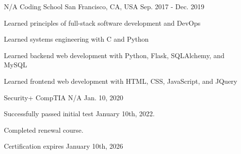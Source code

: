 

\begin{cventries}

	\cventry
	{N/A} %
	{Coding School} %
	{San Francisco, CA, USA} %
	{Sep. 2017 - Dec. 2019} %
	{
		\begin{cvitems} %
			\item {Learned principles of full-stack software development and DevOps}
			\item {Learned systems engineering with C and Python}
			\item {Learned backend web development with Python, Flask, SQLAlchemy, and MySQL}
			\item {Learned frontend web development with HTML, CSS, JavaScript, and JQuery}
		\end{cvitems}
	}
	\cventry
	{Security+}
	{CompTIA}
	{N/A}
	{Jan. 10, 2020}
	{
		\begin{cvitems} %
			\item {Successfully passed initial test January 10th, 2022.}
			\item {Completed renewal course.}
			\item {Certification expires January 10th, 2026}
		\end{cvitems}
	}

\end{cventries}
